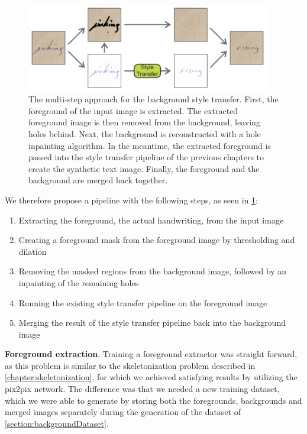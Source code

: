 \begin{figure}
  \centering
  \includegraphics[width=0.95\textwidth]{../assets/background_style_transfer/pipeline/pipeline.pdf}
  \caption[The multi-step approach for the background style transfer]{The multi-step approach for the background style transfer. First, the foreground of the input image is extracted. The extracted foreground image is then removed from the background, leaving holes behind. Next, the background is reconstructed with a hole inpainting algorithm. In the meantime, the extracted foreground is passed into the style transfer pipeline of the previous chapters to create the synthetic text image. Finally, the foreground and the background are merged back together.}
  \label{fig:backgroundPipeline}
\end{figure}


We therefore propose a pipeline with the following steps, as seen in \cref{fig:backgroundPipeline}:

\begin{enumerate}[topsep=0pt,itemsep=-1ex,partopsep=1ex,parsep=1ex]
\item Extracting the foreground, the actual handwriting, from the input image
\item Creating a foreground mask from the foreground image by thresholding and dilation
\item Removing the masked regions from the background image, followed by an inpainting of the remaining holes
\item Running the existing style transfer pipeline on the foreground image
\item Merging the result of the style transfer pipeline back into the background image
\end{enumerate}

\textbf{Foreground extraction}. Training a foreground extractor was straight forward, as this problem is similar to the skeletonization problem described in \cref{chapter:skeletonization}, for which we achieved satisfying results by utilizing the \gls{pix2pix} network. The difference was that we needed a new training dataset, which we were able to generate by storing both the foregrounds, backgrounds and merged images separately during the generation of the dataset of \cref{section:backgroundDataset}.

